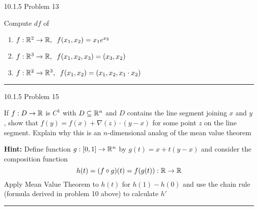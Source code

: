 \documentclass[11pt]{article}
\begin{document}
 10.1.5 Problem 13

Compute $df$ of 
\begin{enumerate}
    \item $f: \mathbb{R}^2 \to \mathbb{R}, \; \; f(x_1, x_2) = x_1 e^{x_2}$
    \item $f: \mathbb{R}^3 \to \mathbb{R}, \; \; f(x_1, x_2, x_3) = (x_3, x_2)$
    \item $f: \mathbb{R}^2 \to \mathbb{R}^3, \; \; f(x_1, x_2) = (x_1, x_2, x_1\cdot x_2)$
\end{enumerate}

\hrule







 10.1.5 Problem 15

If $f: D \to \mathbb{R}$ is $C^1$ with $D \subseteq \mathbb{R}^n$ and $D$ contains the line segment
joining $x$ and $y$, show that $f(y) = f(x) +  \nabla(z) \cdot (y - x)$ for some
point $z$ on the line segment. Explain why this is an $n$-dimensional
analog of the mean value theorem


\textbf{Hint:} Define function $g : [0, 1] \to \mathbb{R}^n$ by $g(t) = x + t(y - x)$
and consider the composition function 
$$h(t) = (f \circ g)(t) = f(g(t)) : \mathbb{R} \to \mathbb{R}$$
Apply Mean Value Theorem to $h(t)$ for $h(1)- h(0)$ and use the chain rule (formula derived
in problem 10 above) to calculate $h'$
\hrule
\end{document}
